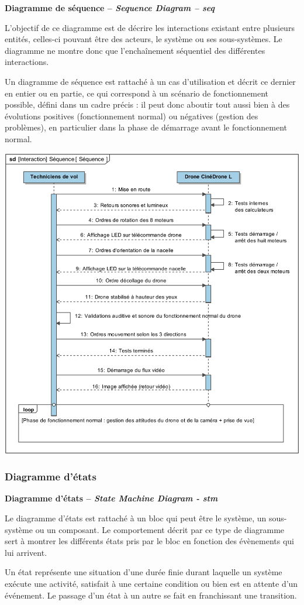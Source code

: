 \documentclass[11pt,oneside]{article}
\begin{document}
\begin{defi}
\textbf{Diagramme de séquence -- \textit{Sequence Diagram -- seq}}

L’objectif de ce diagramme est de décrire les interactions existant entre plusieurs entités,
celles-ci pouvant être des acteurs, le système ou ses sous-systèmes. Le diagramme ne montre
donc que l’enchaînement séquentiel des différentes interactions.

Un diagramme de séquence est rattaché à un cas d’utilisation et décrit ce dernier en entier
ou en partie, ce qui correspond à un scénario de fonctionnement possible, défini dans un
cadre précis : il peut donc aboutir tout aussi bien à des évolutions positives (fonctionnement
normal) ou négatives (gestion des problèmes), en particulier dans la phase de démarrage
avant le fonctionnement normal.
\end{defi}

\begin{center}
\includegraphics[width=.5\textwidth]{png/PNG/SysML_Drone_Seq}
\end{center}



\subsubsection{Diagramme d'états}
\begin{defi}
\textbf{Diagramme d'états -- \textit{State Machine Diagram - stm}}

Le diagramme d’états est rattaché à un bloc qui peut être le système, un sous-système
ou un composant. Le comportement décrit par ce type de diagramme sert à montrer les
différents états pris par le bloc en fonction des évènements qui lui arrivent.

Un état représente une situation d’une durée finie durant laquelle un système exécute une
activité, satisfait à une certaine condition ou bien est en attente d’un événement. Le passage
d’un état à un autre se fait en franchissant une transition.

\end{defi}
\end{document}
